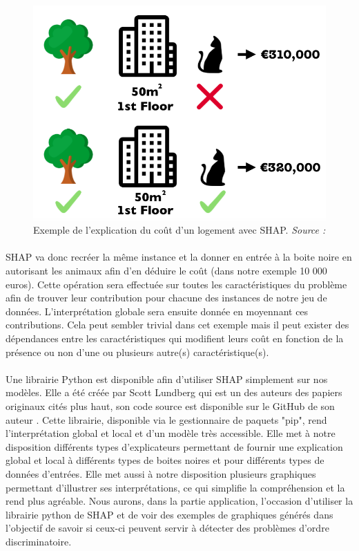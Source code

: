 \begin{figure}[h]
\centering
\includegraphics[scale=0.3]{src_img/shapleyExemple.png}
\caption{Exemple de l'explication du coût d'un logement avec SHAP. \textit{Source : \cite{molnar2019}}}
\label{shapleyExemple}
\end{figure}

\paragraph{}SHAP va donc recréer la même instance et la donner en entrée à la boite noire en autorisant les animaux afin d'en déduire le coût (dans notre exemple 10 000 euros). Cette opération sera effectuée sur toutes les caractéristiques du problème afin de trouver leur contribution pour chacune des instances de notre jeu de données. L'interprétation globale sera ensuite donnée en moyennant ces contributions. Cela peut sembler trivial dans cet exemple mais il peut exister des dépendances entre les caractéristiques qui modifient leurs coût en fonction de la présence ou non d'une ou plusieurs autre(s) caractéristique(s).

\paragraph{}Une librairie Python est disponible afin d'utiliser SHAP simplement sur nos modèles. Elle a été créée par Scott Lundberg qui est un des auteurs des papiers originaux cités plus haut, son code source est disponible sur le GitHub de son auteur \cite{shapDepot}. Cette librairie, disponible via le gestionnaire de paquets "pip", rend l'interprétation global et local et d'un modèle très accessible. Elle met à notre disposition différents types d'explicateurs permettant de fournir une explication global et local à différents types de boites noires et pour différents types de données d'entrées. Elle met aussi à notre disposition plusieurs graphiques permettant d'illustrer ses interprétations, ce qui simplifie la compréhension et la rend plus agréable.  Nous aurons, dans la partie application, l'occasion d'utiliser la librairie python de SHAP et de voir des exemples de graphiques générés dans l'objectif de savoir si ceux-ci peuvent servir à détecter des problèmes d'ordre discriminatoire.


